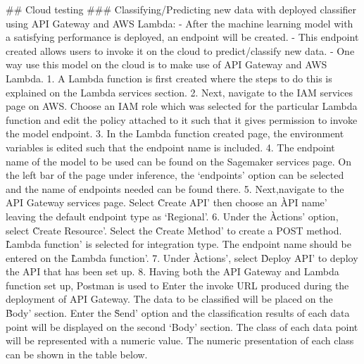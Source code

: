 \begin{markdown}
## Cloud testing
### Classifying/Predicting new data with deployed classifier using API Gateway and AWS Lambda:
- After the machine learning model with a satisfying performance is deployed, an endpoint will be created.
- This endpoint created allows users to invoke it on the cloud to predict/classify new data. 
- One way use this model on the cloud is to make use of API Gateway and AWS Lambda.
1. A Lambda function is first created where the steps to do this is explained on the Lambda services section.
2. Next, navigate to the IAM services page on AWS. Choose an IAM role which was selected for the particular Lambda       function and edit the policy attached to it such that it gives permission to invoke the model endpoint.
3. In the Lambda function created page, the environment variables is edited such that the endpoint name is included.
4. The endpoint name of the model to be used can be found on the Sagemaker services page. On the left bar of the page    under inference, the `endpoints' option can be selected and the name of endpoints needed can be found there.
5. Next,navigate to the API Gateway services page. Select \`Create API' then choose an \`API name' leaving the default     endpoint type as `Regional'.
6. Under the \`Actions' option, select \`Create Resource'. Select the \`Create Method' to create a POST method.     \`Lambda function' is selected for integration type. The endpoint name should be entered on the \`Lambda function'.
7. Under \`Actions', select \`Deploy API' to deploy the API that has been set up.
8. Having both the API Gateway and Lambda function set up, Postman is used to
   Enter the invoke URL produced during the deployment of API Gateway. The data to be classified will be placed on the \`Body' section. Enter the \`Send' option and the classification results of each data point will be displayed on the second `Body' section. The class of each data point will be represented with a numeric value. The numeric presentation of each class can be shown in the table below.
\end{markdown}   

